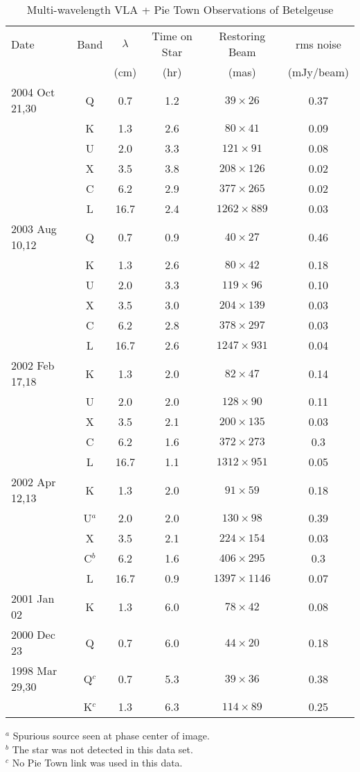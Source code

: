 \begin{table}[!ht]
\begin{center}
\caption[Multi-wavelength VLA + Pie Town Observations of Betelgeuse]
{Multi-wavelength VLA + Pie Town Observations of Betelgeuse}
\begin{tabular}{lccccc}
\hline
\hline
\rule{0pt}{2.5ex} Date & Band&$\lambda$& Time on Star&Restoring Beam&rms noise\\
& & (cm)&  (hr) &(mas)&(mJy/beam)\\
\hline
\rule{0pt}{2.5ex}2004 Oct 21,30 & Q&0.7 & 1.2& $39\times 26$&0.37\\
 & K&1.3 & 2.6& $80\times 41$&0.09\\
 & U&2.0 & 3.3& $121\times 91$&0.08\\
 & X&3.5 & 3.8& $208\times 126$&0.02\\
 & C&6.2 & 2.9& $377\times 265$&0.02\\
 & L&16.7 & 2.4& $1262\times 889$&0.03\\
\hline
\rule{0pt}{2.5ex}2003 Aug 10,12& Q&0.7 & 0.9& $40 \times 27$&0.46\\
 & K&1.3 & 2.6& $80\times 42$&0.18\\
 & U&2.0 & 3.3& $119\times 96$&0.10\\
 & X&3.5 & 3.0& $204\times 139$&0.03\\
 & C&6.2 & 2.8& $378\times 297$&0.03\\
 & L&16.7 & 2.6& $1247\times 931$&0.04\\
\hline
\rule{0pt}{2.5ex}2002 Feb 17,18& K&1.3 & 2.0& $82\times 47$&0.14\\
 & U&2.0 & 2.0&$128\times 90$&0.11\\
 & X&3.5 & 2.1&$200\times 135$ &0.03\\
 & C&6.2 & 1.6& $372\times 273$&0.3\\
 & L&16.7 & 1.1&$1312\times 951$&0.05\\
\hline
\rule{0pt}{2.5ex}2002 Apr 12,13& K&1.3 & 2.0& $91\times 59$&0.18\\
 & U$^{a}$&2.0 & 2.0&$130\times 98$&0.39\\
 & X&3.5 & 2.1& $224\times 154$&0.03\\
 & C$^{b}$&6.2 &1.6 & $406\times 295$&0.3\\
 & L&16.7 & 0.9&$1397\times 1146$&0.07\\
\hline
\rule{0pt}{2.5ex}2001 Jan 02& K&1.3 & 6.0& $78\times 42$&0.08\\
\hline
\rule{0pt}{2.5ex}2000 Dec 23& Q&0.7 & 6.0& $44\times 20$&0.18\\
\hline
\rule{0pt}{2.5ex}1998 Mar 29,30& Q$^{c}$&0.7 & 5.3& $39\times 36$&0.38\\
 & K$^{c}$&1.3 & 6.3& $114\times 89$&0.25\\
\hline
\end{tabular}
\label{tab:3.8}
\begin{minipage}{14.0cm}
$^{a}$ Spurious source seen at phase center of image.\\
$^{b}$ The star was not detected in this data set.\\
$^{c}$ No Pie Town link was used in this data.
\end{minipage}
\end{center}
\end{table}
